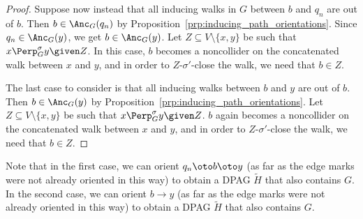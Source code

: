 \begin{proof}
  Suppose now instead that all inducing walks in $G$ between $b$ and $q_n$ are out of $b$. 
  Then $b \in \Anc_G(q_n)$ by Proposition~\ref{prp:inducing_path_orientations}.
  Since $q_n \in \Anc_G(y)$, we get $b \in \Anc_G(y)$.
  Let $Z \subseteq V \setminus \{x,y\}$ be such that $x \Perp^\sigma_G y \given Z$.
  In this case, $b$ becomes a noncollider on the concatenated walk between $x$ and $y$, and in order to $Z$-$\sigma'$-close the walk, we need that $b \in Z$.

  The last case to consider is that all inducing walks between $b$ and $y$ are out of $b$.
  Then $b \in \Anc_G(y)$ by Proposition~\ref{prp:inducing_path_orientations}.
  Let $Z \subseteq V \setminus \{x,y\}$ be such that $x \Perp^\sigma_G y \given Z$.
  $b$ again becomes a noncollider on the concatenated walk between $x$ and $y$, and in order to $Z$-$\sigma'$-close the walk, we need that $b \in Z$.
\end{proof}
Note that in the first case, we can orient $q_n \oto b \oto y$ (as far as the edge marks were not already oriented in this way) to obtain a DPAG $\tilde{H}$ that also contains $G$. 
In the second case, we can orient $b \to y$ (as far as the edge marks were not already oriented in this way) to obtain a DPAG $\tilde{H}$ that also contains $G$.

